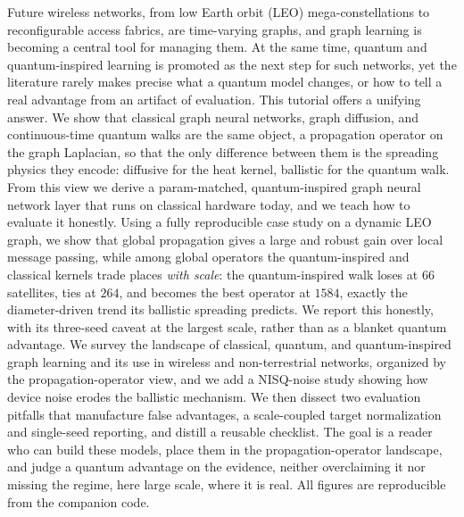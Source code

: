 Future wireless networks, from low Earth orbit (LEO) mega-constellations to
reconfigurable access fabrics, are time-varying graphs, and graph learning is
becoming a central tool for managing them. At the same time, quantum and
quantum-inspired learning is promoted as the next step for such networks, yet the
literature rarely makes precise what a quantum model changes, or how to tell a real
advantage from an artifact of evaluation. This tutorial offers a unifying answer.
We show that classical graph neural networks, graph diffusion, and continuous-time
quantum walks are the same object, a propagation operator on the graph Laplacian,
so that the only difference between them is the spreading physics they encode:
diffusive for the heat kernel, ballistic for the quantum walk. From this view we
derive a param-matched, quantum-inspired graph neural network layer that runs on
classical hardware today, and we teach how to evaluate it honestly. Using a fully
reproducible case study on a dynamic LEO graph, we show that global propagation
gives a large and robust gain over local message passing, while among global operators
the quantum-inspired and classical kernels trade places \emph{with scale}: the
quantum-inspired walk loses at $66$ satellites, ties at $264$, and becomes the best
operator at $1584$, exactly the diameter-driven trend its ballistic spreading predicts.
We report this honestly, with its three-seed caveat at the largest scale, rather than as
a blanket quantum advantage. We survey the landscape of classical, quantum, and
quantum-inspired graph learning and its use in wireless and non-terrestrial networks,
organized by the propagation-operator view, and we add a NISQ-noise study showing how
device noise erodes the ballistic mechanism. We then
dissect two evaluation pitfalls that manufacture false advantages, a scale-coupled
target normalization and single-seed reporting, and distill a reusable checklist.
The goal is a reader who can build these models, place them in the propagation-operator
landscape, and judge a quantum advantage on the evidence, neither overclaiming it nor
missing the regime, here large scale, where it is real. All figures are reproducible from the companion code.
